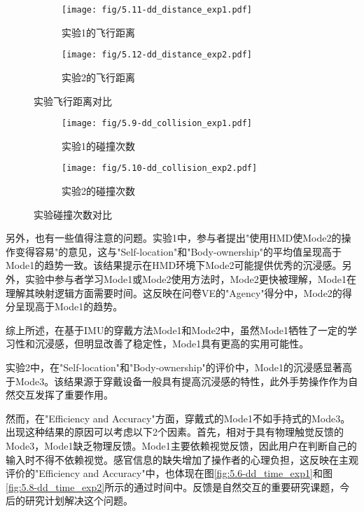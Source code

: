\begin{figure}[htbp]
    \centering
    \begin{subfigure}{\textwidth}
    \texttt{[image: fig/5.11-dd\_distance\_exp1.pdf]}
    \centering
    \caption{实验1的飞行距离}
    \label{fig:5.11-dd_distance_exp1}
    \end{subfigure}
    
    \begin{subfigure}{\textwidth}
    \texttt{[image: fig/5.12-dd\_distance\_exp2.pdf]}
    \centering
    \caption{实验2的飞行距离}
    \label{fig:5.12-dd_distance_exp2}
    \end{subfigure}
        \caption{实验飞行距离对比}
    \label{fig:flight_dis}
\end{figure}


\begin{figure}[htbp]
    \centering
    \begin{subfigure}{\textwidth}
    \texttt{[image: fig/5.9-dd\_collision\_exp1.pdf]}
    \centering
    \caption{实验1的碰撞次数}
    \label{fig:5.9-dd_collision_exp1}
    \end{subfigure}
    
    \begin{subfigure}{\textwidth}
    \texttt{[image: fig/5.10-dd\_collision\_exp2.pdf]}
    \centering
    \caption{实验2的碰撞次数}
    \label{fig:5.10-dd_collision_exp2}
    \end{subfigure}
        \caption{实验碰撞次数对比}
    \label{fig:collision_cnt}
\end{figure}



另外，也有一些值得注意的问题。实验1中，参与者提出"使用HMD使Mode2的操作变得容易"的意见，这与"Self-location"和"Body-ownership"的平均值呈现高于Mode1的趋势一致。该结果提示在HMD环境下Mode2可能提供优秀的沉浸感。另外，实验中参与者学习Mode1或Mode2使用方法时，Mode2更快被理解，Mode1在理解其映射逻辑方面需要时间。这反映在问卷VE的"Agency"得分中，Mode2的得分呈现高于Mode1的趋势。

综上所述，在基于IMU的穿戴方法Mode1和Mode2中，虽然Mode1牺牲了一定的学习性和沉浸感，但明显改善了稳定性，Mode1具有更高的实用可能性。

实验2中，在"Self-location"和"Body-ownership"的评价中，Mode1的沉浸感显著高于Mode3。该结果源于穿戴设备一般具有提高沉浸感的特性，此外手势操作作为自然交互发挥了重要作用。

然而，在"Efficiency and Accuracy"方面，穿戴式的Mode1不如手持式的Mode3。出现这种结果的原因可以考虑以下2个因素。首先，相对于具有物理触觉反馈的Mode3，Mode1缺乏物理反馈。Mode1主要依赖视觉反馈，因此用户在判断自己的输入时不得不依赖视觉。感官信息的缺失增加了操作者的心理负担，这反映在主观评价的"Efficiency and Accuracy"中，也体现在图\ref{fig:5.6-dd_time_exp1}和图\ref{fig:5.8-dd_time_exp2}所示的通过时间中。反馈是自然交互的重要研究课题，今后的研究计划解决这个问题。

